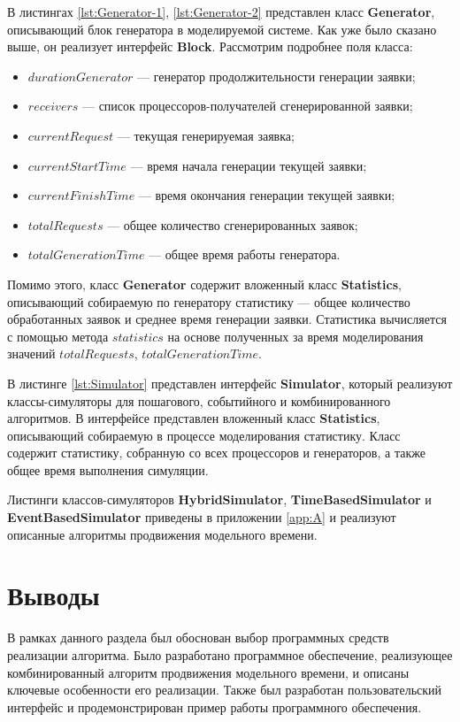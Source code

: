 В листингах \ref{lst:Generator-1}, \ref{lst:Generator-2} представлен класс \textbf{Generator}, описывающий блок генератора в моделируемой системе. Как уже было сказано выше, он реализует интерфейс \textbf{Block}. Рассмотрим подробнее поля класса:
\begin{itemize}
	\item $durationGenerator$ --- генератор продолжительности генерации заявки;
	\item $receivers$ --- список процессоров-получателей сгенерированной заявки;
	\item $currentRequest$ --- текущая генерируемая заявка;
	\item $currentStartTime$ --- время начала генерации текущей заявки;
	\item $currentFinishTime$ --- время окончания генерации текущей заявки;
	\item $totalRequests$ --- общее количество сгенерированных заявок;
	\item $totalGenerationTime$ --- общее время работы генератора.
\end{itemize}
Помимо этого, класс \textbf{Generator} содержит вложенный класс \textbf{Statistics}, описывающий собираемую по генератору статистику --- общее количество обработанных заявок и среднее время генерации заявки. Статистика вычисляется с помощью метода $statistics$ на основе полученных за время моделирования значений $totalRequests$, $totalGenerationTime$.
\clearpage
{}


В листинге \ref{lst:Simulator} представлен интерфейс \textbf{Simulator}, который реализуют классы-симуляторы для пошагового, событийного и комбинированного алгоритмов. В интерфейсе представлен вложенный класс \textbf{Statistics}, описывающий собираемую в процессе моделирования статистику. Класс содержит статистику, собранную со всех процессоров и генераторов, а также общее время выполнения симуляции.

Листинги классов-симуляторов \textbf{HybridSimulator}, \textbf{TimeBasedSimulator} и \textbf{EventBasedSimulator} приведены в приложении \ref{app:A} и реализуют описанные алгоритмы продвижения модельного времени.

\section{Выводы}
В рамках данного раздела был обоснован выбор программных средств реализации алгоритма. Было разработано программное обеспечение, реализующее комбинированный алгоритм продвижения модельного времени, и описаны ключевые особенности его реализации. Также был разработан пользовательский интерфейс и продемонстрирован пример работы программного обеспечения.